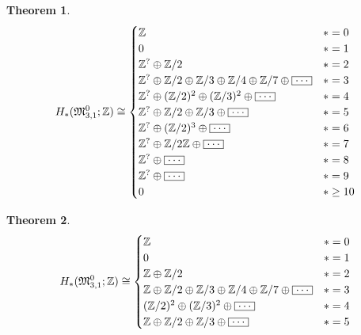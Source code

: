 \documentclass[12pt]{beamer}            %
\newcommand{\bldots}{\raisebox{.5ex}{\fbox{$\ldots$}}}
\newtheorem*{thm*}{Theorem}
\begin{document}
\begin{frame}
{    }
    {
        \begin{thm*}
        \[
            H_\ast( \mathfrak{M}_{3,1}^0; \mathbb Z ) \cong
            \begin{cases}
                \mathbb Z           & \ast = 0\\
                0                   & \ast = 1\\
                \mathbb Z^? \oplus \mathbb Z / 2                                  & \ast = 2\\
                \mathbb Z^? \oplus \mathbb Z/2 \oplus \mathbb Z/3 \oplus \mathbb Z/4 \oplus \mathbb Z/7 \oplus \bldots & \ast = 3\\
                \mathbb Z^? \oplus (\mathbb Z/2)^2 \oplus (\mathbb Z/3)^2  \oplus \bldots          & \ast = 4\\
                \mathbb Z^? \oplus \mathbb Z/2 \oplus \mathbb Z/3  \oplus \bldots & \ast = 5\\
                \mathbb Z^? \oplus (\mathbb Z/2)^3  \oplus \bldots                & \ast = 6\\
                \mathbb Z^? \oplus \mathbb Z/ 2\mathbb Z  \oplus \bldots   & \ast = 7\\
                \mathbb Z^? \oplus \bldots               & \ast = 8\\
                \mathbb Z^?  \oplus \bldots       & \ast = 9\\
                0                               & \ast \ge 10\\
            \end{cases}
        \]
        \end{thm*}
    }
    {
        \begin{thm*}
        \[
            H_\ast( \mathfrak{M}_{3,1}^0; \mathbb Z ) \cong
            \begin{cases}
                \mathbb Z           & \ast = 0\\
                0                   & \ast = 1\\
                \mathbb Z \oplus \mathbb Z / 2                                  & \ast = 2\\
                \mathbb Z \oplus \mathbb Z/2 \oplus \mathbb Z/3 \oplus \mathbb Z/4 \oplus \mathbb Z/7 \oplus \bldots & \ast = 3\\
                (\mathbb Z/2)^2 \oplus (\mathbb Z/3)^2  \oplus \bldots          & \ast = 4\\
                \mathbb Z \oplus \mathbb Z/2 \oplus \mathbb Z/3  \oplus \bldots & \ast = 5\\

\end{cases}\]
\end{thm*}}
\end{frame}
\end{document}
